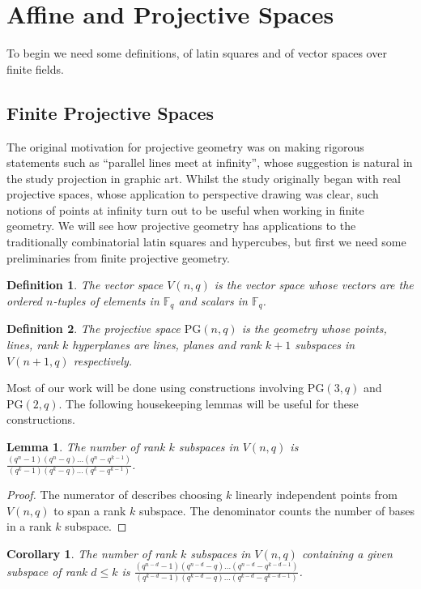 \documentclass{article}
\newtheorem{lemma}{Lemma}
\newtheorem{corollary}{Corollary}
\newtheorem{definition}{Definition}
\newcommand{\PG}{\mathrm{PG}}
\begin{document}
    \section{Affine and Projective Spaces}
    To begin we need some definitions, of latin squares and of vector spaces over finite fields.

    \subsection{Finite Projective Spaces}

    The original motivation for projective geometry was on making rigorous statements such as “parallel lines meet at infinity”, whose suggestion is natural in the study projection in graphic art. Whilst the study originally began with real projective spaces, whose application to perspective drawing was clear, such notions of points at infinity turn out to be useful when 
    working in finite geometry. We will see how projective geometry has applications to the traditionally combinatorial latin squares and hypercubes, but first we need some preliminaries from finite projective geometry.

    \begin{definition}
        The vector space \(V(n, q)\) is the vector space whose vectors are the ordered \(n\)-tuples of elements in \(\mathbb{F}_q\) and scalars in \(\mathbb{F}_q\).
    \end{definition}

    \begin{definition}
        The projective space \(\PG(n, q)\) is the geometry whose points, lines, rank \(k\) hyperplanes are lines, planes and rank \(k + 1\) subspaces in \(V(n + 1, q)\) respectively. 
    \end{definition}

    Most of our work will be done using constructions involving \(\PG(3, q)\) and \(\PG(2, q)\). The following housekeeping lemmas will be useful for these constructions.

    \begin{lemma}\label{lemma:1}
        The number of rank \(k\) subspaces in \(V(n, q)\) is \(\frac{(q^n - 1)(q^n - q)\ldots (q^n - q^{k - 1})}{(q^k - 1)(q^k - q)\ldots (q^k - q^{k - 1})}\).
    \end{lemma}
    \begin{proof}
        The numerator of describes choosing \(k\) linearly independent points from \(V(n, q)\) to span a rank \(k\) subspace. The denominator counts the number of bases in a rank \(k\) subspace.
    \end{proof}
    \begin{corollary}
        The number of rank \(k\) subspaces in \(V(n, q)\) containing a given subspace of rank \(d \leq k\) is 
        \(\frac{(q^{n - d} - 1)(q^{n - d} - q) \ldots (q^{n - d} - q^{k - d - 1})}{(q^{k - d} - 1) (q^{k - d} - q) \ldots (q^{k - d} - q^{k - d - 1})}\).
    \end{corollary}
\end{document}

